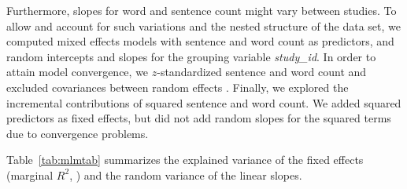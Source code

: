 \documentclass[jou,a4paper]{apa6}\usepackage[]{graphicx}\usepackage[]{color}
\begin{document}
Furthermore, slopes for word and sentence count might vary between studies. To allow and account for such variations and the nested structure of the data set, we computed mixed effects models with sentence and word count as predictors, and random intercepts and slopes for the grouping variable \emph{study\_id}. In order to attain model convergence, we $z$-standardized sentence and word count and excluded covariances between random effects \parencite{bates_parsimonious_2015}. Finally, we explored the incremental contributions of squared sentence and word count. We added squared predictors as fixed effects, but did not add random slopes for the squared terms due to convergence problems.

Table~\ref{tab:mlmtab} summarizes the explained variance of the fixed effects (marginal $R^2$, ) and the random variance of the linear slopes.
\end{document}
